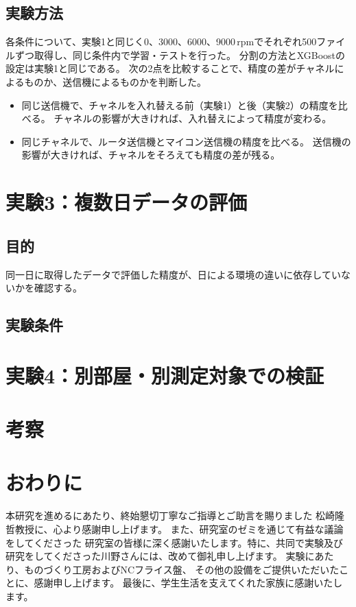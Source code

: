 \documentclass[uplatex, 12pt]{ujbook}
\begin{document}
\section{実験方法}
各条件について、実験1と同じく0、3000、6000、9000\,rpmでそれぞれ500ファイルずつ取得し、同じ条件内で学習・テストを行った。
分割の方法とXGBoostの設定は実験1と同じである。
次の2点を比較することで、精度の差がチャネルによるものか、送信機によるものかを判断した。
\begin{itemize}
  \item 同じ送信機で、チャネルを入れ替える前（実験1）と後（実験2）の精度を比べる。
        チャネルの影響が大きければ、入れ替えによって精度が変わる。
  \item 同じチャネルで、ルータ送信機とマイコン送信機の精度を比べる。
        送信機の影響が大きければ、チャネルをそろえても精度の差が残る。
\end{itemize}

\chapter{実験3：複数日データの評価}
\section{目的}
同一日に取得したデータで評価した精度が、日による環境の違いに依存していないかを確認する。
\section{実験条件}

\chapter{実験4：別部屋・別測定対象での検証}
\chapter{考察}

\chapter{おわりに}

\acknowledgment

本研究を進めるにあたり、終始懇切丁寧なご指導とご助言を賜りました 松崎隆哲教授に、心より感謝申し上げます。
また、研究室のゼミを通じて有益な議論をしてくださった
研究室の皆様に深く感謝いたします。特に、共同で実験及び研究をしてくださった川野さんには、改めて御礼申し上げます。
実験にあたり、ものづくり工房およびNCフライス盤、
その他の設備をご提供いただいたことに、感謝申し上げます。
最後に、学生生活を支えてくれた家族に感謝いたします。
\end{document}
